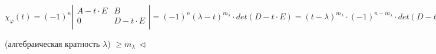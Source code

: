 $\chi_{\varphi}(t) = (-1)^n \left| \begin{array}{c|c}
  A - t \cdot E & B  \\
  \hline
  0 & D - t \cdot E  \\
\end{array}
\right|  = (-1)^n (\lambda - t)^{m_\lambda} \cdot det (D - t \cdot E) = (t - \lambda)^{m_\lambda} \cdot (-1)^{n - m_{\lambda}} \cdot det (D - t \cdot E) \Rightarrow \chi_{\varphi} (t) \vdots (t - \lambda)^{m_{\lambda}} \Rightarrow$

(алгебраическая кратность $\lambda$) $\geq m_{\lambda} \ \lhd$

